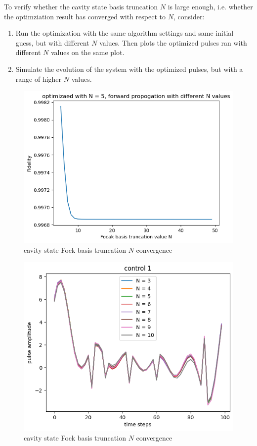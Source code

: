 \documentclass[12pt]{report}
\begin{document}
To verify whether the cavity state basis truncation $N$ is large enough, i.e. 
whether the optimziation result has converged with respect to $N$, consider: 
\begin{enumerate}
    \item Run the optimization with the same algorithm settings and same initial guess, but with different $N$ values. 
        Then plots the optimized pulses ran with different $N$ values on the same plot. 
    \item Simulate the evolution of the system with the optimized pulses, but with a range of higher $N$ values. 
\end{enumerate}

\begin{figure}[H]
    \centering
    \includegraphics[width=0.95\linewidth]{vac2coherent_N_convergence.png}
    \caption{cavity state Fock basis truncation $N$ convergence}
    \label{fig:vac2coherent_N_convergence}
\end{figure}

\begin{figure}[H]
    \centering
    \includegraphics[width=0.95\linewidth]{check_convergence_control1.png}
    \caption{cavity state Fock basis truncation $N$ convergence}
    \label{fig:check_convergence_control1}
\end{figure}
\end{document}
